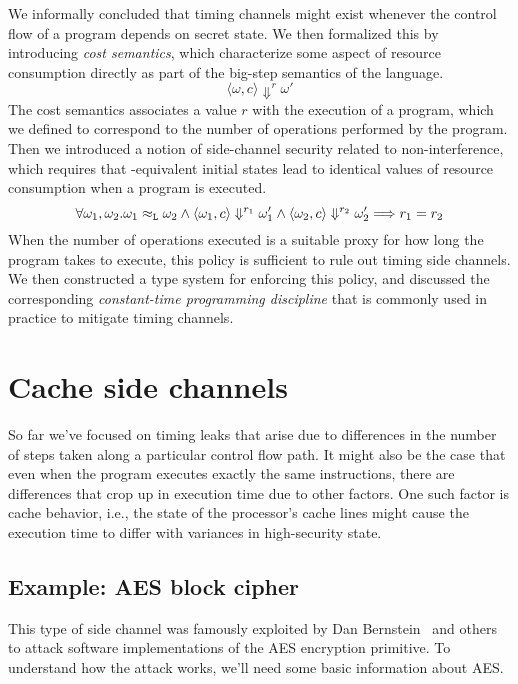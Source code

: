 \documentclass[11pt,twoside]{scrartcl}
\begin{document}
We informally concluded that timing channels might exist whenever the control flow of a program depends on secret state. We then formalized this by introducing \emph{cost semantics}, which characterize some aspect of resource consumption directly as part of the big-step semantics of the language.
\[
\langle \omega, c\rangle \Downarrow^r \omega'
\]
The cost semantics associates a value $r$ with the execution of a program, which we defined to correspond to the number of operations performed by the program. Then we introduced a notion of side-channel security related to non-interference, which requires that \lowsec-equivalent initial states lead to identical values of resource consumption when a program is executed.
\begin{equation}
\label{eq:costnonint}
\forall \omega_1,\omega_2 . \omega_1 \approx_\lowt \omega_2 \land \langle \omega_1, c\rangle \Downarrow^{r_1} \omega_1' \land \langle\omega_2, c\rangle\Downarrow^{r_2}\omega_2' \Longrightarrow r_1 = r_2
\end{equation}
When the number of operations executed is a suitable proxy for how long the program takes to execute, this policy is sufficient to rule out timing side channels. We then constructed a type system for enforcing this policy, and discussed the corresponding \emph{constant-time programming discipline} that is commonly used in practice to mitigate timing channels.

\section{Cache side channels}

So far we've focused on timing leaks that arise due to differences in the number of steps taken along a particular control flow path. It might also be the case that even when the program executes exactly the same instructions, there are differences that crop up in execution time due to other factors. One such factor is cache behavior, i.e., the state of the processor's cache lines might cause the execution time to differ with variances in high-security state.


\subsection{Example: AES block cipher}
This type of side channel was famously exploited by Dan Bernstein~\cite{Bernstein04} and others to attack software implementations of the AES encryption primitive. To understand how the attack works, we'll need some basic information about AES. 
\end{document}
